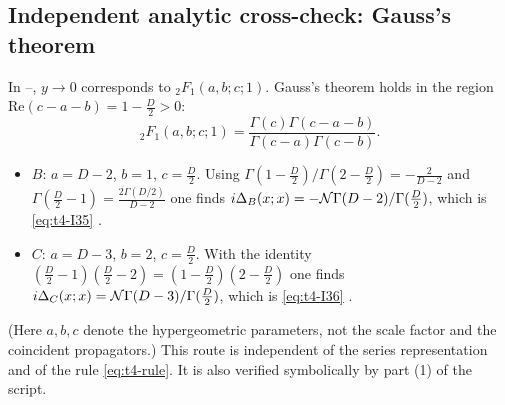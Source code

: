 \subsection{Independent analytic cross-check: Gauss's theorem \texorpdfstring{\tC}{}}\label{sec:t4-gauss}
In --, \(y\to0\) corresponds to \({}_2F_1(a,b;c;1)\). Gauss's theorem holds in the
region \(\mathrm{Re}(c-a-b)=1-\tfrac D2>0\):
\begin{equation}\label{eq:t4-gauss}
{}_2F_1(a,b;c;1)=\frac{\Gamma(c)\Gamma(c-a-b)}{\Gamma(c-a)\Gamma(c-b)}.
\end{equation}
\begin{itemize}
\item \(B\): \(a=D-2\), \(b=1\), \(c=\tfrac D2\). Using \(\Gamma(1-\tfrac D2)/\Gamma(2-\tfrac D2)=-\tfrac2{D-2}\)
and \(\Gamma(\tfrac D2-1)=\tfrac{2\Gamma(D/2)}{D-2}\) one finds
\(i\Delta_B(x;x)=-\mathcal N\Gamma(D-2)/\Gamma(\tfrac D2)\), which is \eqref{eq:t4-I35} \chIIok.
\item \(C\): \(a=D-3\), \(b=2\), \(c=\tfrac D2\). With the identity
\((\tfrac D2-1)(\tfrac D2-2)=(1-\tfrac D2)(2-\tfrac D2)\) one finds
\(i\Delta_C(x;x)=\mathcal N\Gamma(D-3)/\Gamma(\tfrac D2)\), which is \eqref{eq:t4-I36} \chIIok.
\end{itemize}
(Here \(a,b,c\) denote the hypergeometric parameters, not the scale factor and the
coincident propagators.) This route is independent of the series representation and of
the rule \eqref{eq:t4-rule}. It is also verified symbolically by part (1) of the script.

